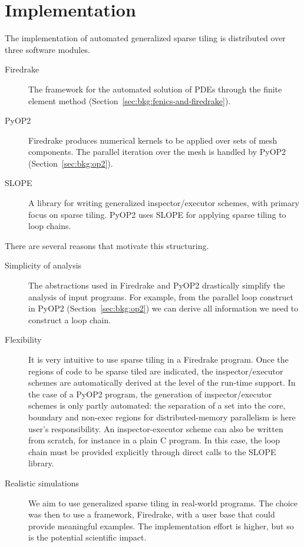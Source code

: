 
\section{Implementation}
\label{sec:tiling:automation}
The implementation of automated generalized sparse tiling is distributed over three software modules. 
\begin{description}
\item[Firedrake] The framework for the automated solution of PDEs through the finite element method (Section~\ref{sec:bkg:fenics-and-firedrake}).
\item[PyOP2] Firedrake produces numerical kernels to be applied over sets of mesh components. The parallel iteration over the mesh is handled by PyOP2 (Section~\ref{sec:bkg:op2}).
\item[SLOPE] A library for writing generalized inspector/executor schemes, with primary focus on sparse tiling. PyOP2 uses SLOPE for applying sparse tiling to loop chains.
\end{description}

There are several reasons that motivate this structuring.
\begin{description}
\item[Simplicity of analysis] The abstractions used in Firedrake and PyOP2 drastically simplify the analysis of input programs. For example, from the parallel loop construct in PyOP2 (Section~\ref{sec:bkg:op2}) we can derive all information we need to construct a loop chain.
\item[Flexibility] It is very intuitive to use sparse tiling in a Firedrake program. Once the regions of code to be sparse tiled are indicated, the inspector/executor schemes are automatically derived at the level of the run-time support. In the case of a PyOP2 program, the generation of inspector/executor schemes is only partly automated: the separation of a set into the core, boundary and non-exec regions for distributed-memory parallelism is here user's responsibility. An inspector-executor scheme can also be written from scratch, for instance in a plain C program. In this case, the loop chain must be provided explicitly through direct calls to the SLOPE library. 
\item[Realistic simulations] We aim to use generalized sparse tiling in real-world programs. The choice was then to use a framework, Firedrake, with a user base that could provide meaningful examples. The implementation effort is higher, but so is the potential scientific impact.
\end{description}

